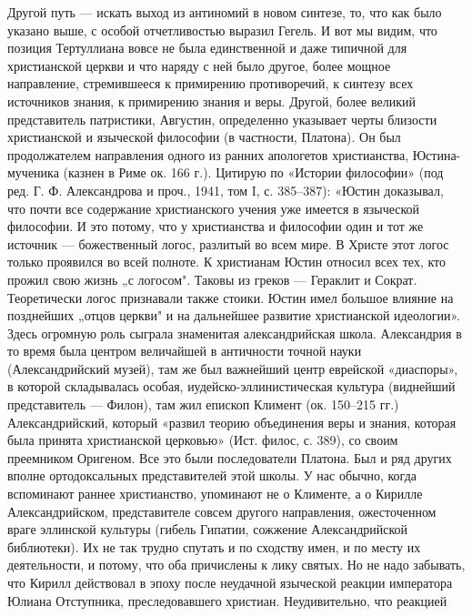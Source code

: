 Другой путь --- искать выход из антиномий в новом синтезе, то, что как
было указано  выше, с  особой отчетливостью выразил  Гегель. И  вот мы
видим,  что позиция  Тертуллиана  вовсе не  была  единственной и  даже
типичной  для христианской  церкви и  что  наряду с  ней было  другое,
более  мощное  направление,  стремившееся к  примирению  противоречий,
к  синтезу  всех  источников  знания,  к  примирению  знания  и  веры.
Другой, более великий  представитель патристики, Августин, определенно
указывает  черты  близости  христианской   и  языческой  философии  (в
частности, Платона). Он был продолжателем направления одного из ранних
апологетов христианства,  Юстина-мученика (казнен в Риме  ок. 166 г.).
Цитирую  по  «Истории  философии»  (под  ред.  Г.  Ф.  Александрова  и
проч.,  1941, том  I, с.  385--387): «Юстин  доказывал, что  почти все
содержание  христианского учения  уже имеется  в языческой  философии.
И  это  потому,  что  у  христианства   и  философии  один  и  тот  же
источник  --- божественный  логос,  разлитый во  всем  мире. В  Христе
этот  логос  только проявился  во  всей  полноте. К  христианам  Юстин
относил  всех  тех, кто  прожил  свою  жизнь  „с логосом".  Таковы  из
греков  --- Гераклит  и  Сократ. Теоретически  логос признавали  также
стоики. Юстин имел  большое влияние на позднейших „отцов  церкви" и на
дальнейшее  развитие  христианской  идеологии».  Здесь  огромную  роль
сыграла  знаменитая  александрийская  школа. Александрия  в  то  время
была  центром величайшей  в античности  точной науки  (Александрийский
музей), там  же был  важнейший центр  еврейской «диаспоры»,  в которой
складывалась  особая,   иудейско-эллинистическая  культура  (виднейший
представитель  ---  Филон),  там  жил епископ  Климент  (ок.  150--215
гг.)  Александрийский,  который  «развил  теорию  объединения  веры  и
знания, которая  была принята  христианской церковью» (Ист.  филос, с.
389),  со  своим  преемником  Оригеном.  Все  это  были  последователи
Платона. Был  и ряд  других вполне ортодоксальных  представителей этой
школы. У  нас обычно, когда вспоминают  раннее христианство, упоминают
не  о  Клименте, а  о  Кирилле  Александрийском, представителе  совсем
другого  направления, ожесточенном  враге  эллинской культуры  (гибель
Гипатии,  сожжение  Александрийской  библиотеки).  Их  не  так  трудно
спутать и по сходству имен, и  по месту их деятельности, и потому, что
оба  причислены  к  лику  святых.  Но не  надо  забывать,  что  Кирилл
действовал в эпоху после неудачной языческой реакции императора Юлиана
Отступника,  преследовавшего  христиан.  Неудивительно,  что  реакцией
